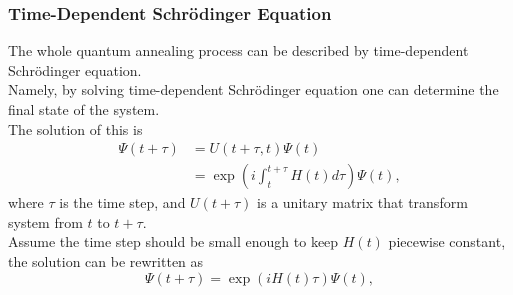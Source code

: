 \documentclass{beamer}
\begin{document}
\begin{frame}
	\frametitle{Time-Dependent Schrödinger Equation}
	The whole quantum annealing process can be described by time-dependent Schrödinger equation.\\ 
	Namely, by solving time-dependent Schrödinger equation one can determine the final state of the system.\\
	The solution of this is 
	\begin{equation*}
	\begin{split}
	\Psi(t+\tau)&=U(t+\tau,t)\Psi(t)\\
	&=\exp(i\int_{t}^{t+\tau}H(t)d\tau)\Psi(t),
	\end{split}
	\end{equation*}
	where $\tau$ is the time step, and $U(t+\tau)$ is a unitary matrix that transform system from $t$ to $t+\tau$.\\
	Assume the time step should be small enough to keep $H(t)$ piecewise constant, the solution can be rewritten as 
	\begin{equation*}
	\Psi(t+\tau) =\exp(iH(t)\tau)\Psi(t),
	\end{equation*}
\end{frame}
\end{document}

